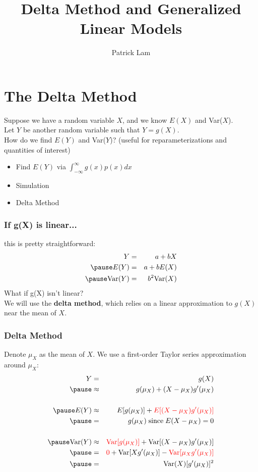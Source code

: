 \documentclass[handout]{beamer}
\author{Patrick Lam}
\title{Delta Method and Generalized Linear Models}
\date{}
\begin{document}
\newcommand{\red}{\textcolor{red}}
\newcommand{\blue}{\textcolor{blue}}
\newcommand{\purple}{\textcolor{purple}}
\newcommand{\brown}{\textcolor{brown}}

\frame{\titlepage}

\section{The Delta Method}

\begin{frame}
\pause
Suppose we have a random variable $X$, and we know $E(X)$ and Var($X$).\\
\pause
\bigskip
Let $Y$ be another random variable such that $Y = g(X)$. \\
\pause
\bigskip
How do we find $E(Y)$ and Var($Y$)? \pause (useful for
reparameterizations and quantities of interest) \\
\pause
\begin{itemize}
\item Find $E(Y)$ via $\int_{-\infty}^{\infty} g(x) p(x) dx$
\pause
\item Simulation
\pause
\item Delta Method
\end{itemize}
\end{frame}

\begin{frame}
\frametitle{If g(X) is linear...}
\pause
this is pretty straightforward:
\pause
\begin{eqnarray*}
Y &=& a + bX \\
\pause
E(Y) &=& a + b E(X) \\
\pause
\mathrm{Var}(Y) &=& b^2 \mathrm{Var}(X)
\end{eqnarray*}
\pause
What if g(X) isn't linear? \\
\bigskip
\pause
We will use the \textbf{delta method}, which relies on a linear approximation to $g(X)$ near the mean of $X$.
\end{frame}

\begin{frame}
\frametitle{Delta Method}
\pause
Denote $\mu_X$ as the mean of $X$. \pause We use a first-order
Taylor series approximation around $\mu_X$:
\pause
\begin{eqnarray*}
Y &=& g(X) \\
\pause
&\approx& g(\mu_X) + (X - \mu_X) g'(\mu_X) \\ \\
\pause 
E(Y) &\approx& E[g(\mu_X)] + \red{E[(X - \mu_X) g'(\mu_X)]} \\
\pause
&=& g(\mu_X) \; \mathrm{since \;}E(X-\mu_X) = 0 \\ \\
\pause
\mathrm{Var}(Y) &\approx& \red{\mathrm{Var}[g(\mu_X)]} + \mathrm{Var}[(X -
\mu_X) g'(\mu_X)] \\
\pause
&=& \red{0} + \mathrm{Var}[X g'(\mu_X)] - \red{\mathrm{Var}[\mu_X g'(\mu_X) ]} \\
\pause
&=& \mathrm{Var}(X) [g'(\mu_X)]^2
\end{eqnarray*}

\end{frame}
\end{document}
